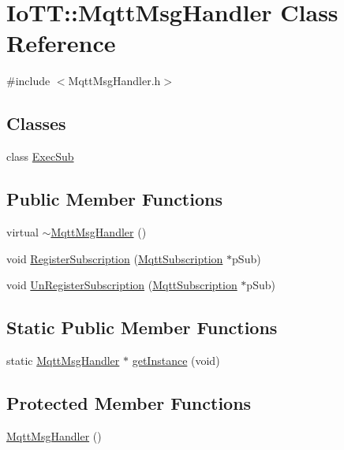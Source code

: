 \hypertarget{classIoTT_1_1MqttMsgHandler}{}\section{Io\+TT\+:\+:Mqtt\+Msg\+Handler Class Reference}
\label{classIoTT_1_1MqttMsgHandler}


{\ttfamily \#include $<$Mqtt\+Msg\+Handler.\+h$>$}

\subsection*{Classes}
\begin{DoxyCompactItemize}
\item 
class \hyperlink{classIoTT_1_1MqttMsgHandler_1_1ExecSub}{Exec\+Sub}
\end{DoxyCompactItemize}
\subsection*{Public Member Functions}
\begin{DoxyCompactItemize}
\item 
virtual \hyperlink{classIoTT_1_1MqttMsgHandler_ae5c149f6342c56965941bb18239e8057}{$\sim$\+Mqtt\+Msg\+Handler} ()
\item 
void \hyperlink{classIoTT_1_1MqttMsgHandler_ae15fbcd8dedccaf532f115fe1c728e40}{Register\+Subscription} (\hyperlink{classIoTT_1_1MqttSubscription}{Mqtt\+Subscription} $\ast$p\+Sub)
\item 
void \hyperlink{classIoTT_1_1MqttMsgHandler_a20d87733262efb223015c856a8cfcfaf}{Un\+Register\+Subscription} (\hyperlink{classIoTT_1_1MqttSubscription}{Mqtt\+Subscription} $\ast$p\+Sub)
\end{DoxyCompactItemize}
\subsection*{Static Public Member Functions}
\begin{DoxyCompactItemize}
\item 
static \hyperlink{classIoTT_1_1MqttMsgHandler}{Mqtt\+Msg\+Handler} $\ast$ \hyperlink{classIoTT_1_1MqttMsgHandler_aed5b042e8cfa1de172012bdfa0dc081a}{get\+Instance} (void)
\end{DoxyCompactItemize}
\subsection*{Protected Member Functions}
\begin{DoxyCompactItemize}
\item 
\hyperlink{classIoTT_1_1MqttMsgHandler_a0a1213f50a75d07c3690d99a94fe118b}{Mqtt\+Msg\+Handler} ()
\end{DoxyCompactItemize}

